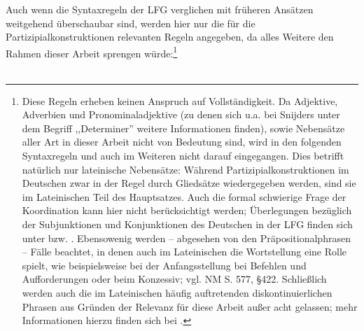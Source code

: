 \documentclass[12pt,a4paper]{article}
\begin{document}
Auch wenn die Syntaxregeln der LFG verglichen mit früheren Ansätzen weitgehend überschaubar sind, werden hier nur die für die Partizipialkonstruktionen relevanten Regeln angegeben, da alles Weitere den Rahmen dieser Arbeit sprengen würde:\footnote{Diese Regeln erheben keinen Anspruch auf Vollständigkeit. Da Adjektive, Adverbien und Pronominaladjektive (zu denen sich u.a. bei Snijders unter dem Begriff ,,Determiner'' weitere Informationen finden), sowie Nebensätze aller Art  in dieser Arbeit nicht von Bedeutung sind, wird in den folgenden Syntaxregeln und auch im Weiteren nicht darauf eingegangen. Dies betrifft natürlich nur lateinische Nebensätze: Während Partizipialkonstruktionen im Deutschen zwar in der Regel durch Gliedsätze wiedergegeben werden, sind sie im Lateinischen Teil des Hauptsatzes. Auch die formal schwierige Frage der Koordination kann hier nicht berücksichtigt werden; Überlegungen bezüglich der Subjunktionen und Konjunktionen des Deutschen in der LFG finden sich unter \cite[103-119]{Skript} bzw. \cite[120-136]{Skript}. Ebensowenig werden -- abgesehen von den Präpositionalphrasen -- Fälle beachtet, in denen auch im Lateinischen die Wortstellung eine Rolle spielt, wie beispielsweise bei der Anfangsstellung bei Befehlen und Aufforderungen oder beim Konzessiv; vgl. NM S. 577, §422. Schließlich werden auch die im Lateinischen häufig auftretenden diskontinuierlichen Phrasen aus Gründen der Relevanz für diese Arbeit außer acht gelassen; mehr Informationen hierzu finden sich bei \cite{Snijders}.} 
\\
\\
\end{document}
